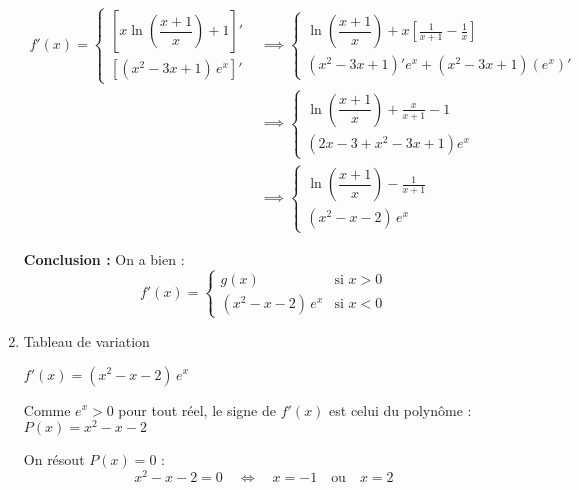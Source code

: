 \documentclass[12pt,a4paper]{article}
\begin{document}
\begin{enumerate}
          \(
          \begin{aligned}
              f'(x) =
              \begin{cases}
                  \left[x\ln\left( \dfrac{x+1}{x} \right) + 1\right]' \\
                  \left[(x^2 - 3x + 1)\, e^x\right]'
              \end{cases}
               & \implies
              \begin{cases}
                  \ln\left( \dfrac{x+1}{x} \right)+x\left[\frac{1}{x+1}-\frac{1}{x}\right] \\
                  \left( x^2 - 3x + 1 \right)' e^x + \left( x^2 - 3x + 1 \right) (e^x)'
              \end{cases} \\
               & \implies
              \begin{cases}
                  \ln\left( \dfrac{x+1}{x} \right)+\frac{x}{x+1}-1 \\
                  \left( 2x - 3 + x^2 - 3x + 1 \right) e^x
              \end{cases}                                               \\
               & \implies
              \begin{cases}
                  \ln\left( \dfrac{x+1}{x} \right)-\frac{1}{x+1} \\
                  (x^2 - x - 2)\, e^x
              \end{cases}
          \end{aligned}
          \)

          \textbf{Conclusion :} On a bien :
          \[
              f'(x) =
              \begin{cases}
                  g(x)                & \text{si } x > 0 \\
                  (x^2 - x - 2)\, e^x & \text{si } x < 0
              \end{cases}
          \]
    \item Tableau de variation

          \(f'(x) = (x^2 - x - 2)\, e^x\)

          Comme \( e^x > 0 \) pour tout réel, le signe de \( f'(x) \) est celui du polynôme :\(P(x) = x^2 - x - 2\)

          On résout \( P(x) = 0 \) :
          \[
              x^2 - x - 2 = 0 \quad \Longleftrightarrow \quad x = -1 \quad \text{ou} \quad x = 2
          \]


\end{enumerate}
\end{document}

